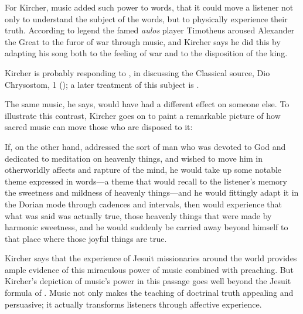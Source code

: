 For Kircher, music added such power to words, that it could move a listener not
only to understand the subject of the words, but to physically experience their
truth.
According to legend the famed \emph{aulos} player Timotheus aroused Alexander
the Great to the furor of war through music, and Kircher says he did this by
adapting his song both to the feeling of war and to the disposition of the
king.%
\begin{Footnote}
    Kircher is probably responding to \autocite[90]{Galilei:Dialogo}, in
    discussing the Classical source, Dio Chrysostom,  1
    (); a later treatment of this subject is
    \autocite{Dryden:Alexander}.
\end{Footnote}
The same music, he says, would have had a different effect on someone else.
To illustrate this contrast, Kircher goes on to paint a remarkable picture of
how sacred music can move those who are disposed to it:
\begin{quoting}
    If, on the other hand,  addressed the sort of man who was
    devoted to God and dedicated to meditation on heavenly things, and wished to
    move him in otherworldly affects and rapture of the mind, he would take up
    some notable theme expressed in words---a theme that would recall to the
    listener's memory the sweetness and mildness of heavenly things---and he
    would fittingly adapt it in the Dorian mode through cadences and intervals,
    then  would experience that what was said was actually
    true, those heavenly things that were made by harmonic sweetness, and he
    would suddenly be carried away beyond himself to that place where those
    joyful things are true.%
        \Autocite[, . 
        The Latin is difficult enough to merit a full citation: 
        {Sicuti contra, si quis Deo deuotum hominum rerumque coelestium,
        meditationi deditum in exoticos affectus raptusque mentis commouere
        vellet is supra insigne aliquod verborum thema, quod rerum caelestium
        dulcedinem, \et{} suauitatem auditori in memoriam reuocaret, modulo
        dorio per clausulas interuallaque aptè adaptet, \et{} experietur quod
        dixi verum esse, statim extra se factos dulcedine harmonica eò, vbi vera
        sunt gaudi rapi: vidi ego nonsemel in viris ordinis nostri sanctitate
        illustribus huiusmodi experimenta}.] 
        {Kircher:Musurgia}
\end{quoting}
Kircher says that the experience of Jesuit missionaries around the world
provides ample evidence of this miraculous power of music combined with
preaching.
But Kircher's depiction of music's power in this passage goes well beyond the
Jesuit formula of .%
    \Autocite
    [On the Jesuit approach to religious arts, see] 
    [35--51]{Bailey:Art}
Music not only makes the teaching of doctrinal truth appealing and persuasive;
it actually transforms listeners through affective experience.


